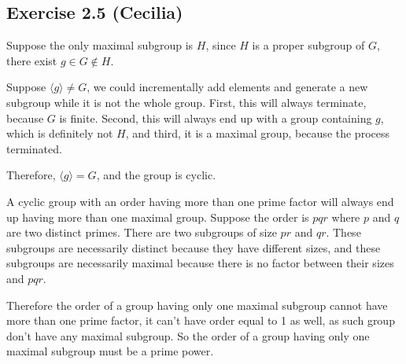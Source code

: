 \subsection*{Exercise 2.5 (Cecilia)}
Suppose the only maximal subgroup is $ H $, since $ H $ is a proper subgroup of $ G $, there exist $ g \in G \notin H $.

Suppose $ \langle g \rangle \ne G $, we could incrementally add elements and generate a new subgroup while it is not the whole group. First, this will always terminate, because $ G $ is finite.
Second, this will always end up with a group containing $ g $, which is definitely not $ H $, and
third, it is a maximal group, because the process terminated.

Therefore, $ \langle g \rangle = G $, and the group is cyclic.

A cyclic group with an order having more than one prime factor will always end up having more than one maximal group. Suppose the order is $ pqr $ where $ p $ and $ q $ are two distinct primes. There are two subgroups of size $ pr $ and $ qr $. These subgroups are necessarily distinct because they have different sizes, and these subgroups are necessarily maximal because there is no factor between their sizes and $ pqr $.

Therefore the order of a group having only one maximal subgroup cannot have more than one prime factor, it can't have order equal to 1 as well, as such group don't have any maximal subgroup. So the order of a group having only one maximal subgroup must be a prime power.
